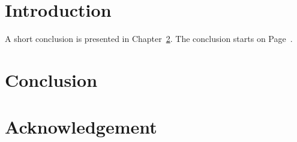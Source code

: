 \documentclass[12pt, a4paper]{book}
\begin{document}
	\frontmatter
		\maketitle
		\tableofcontents
	\mainmatter
		\chapter{Introduction}
		A short conclusion is presented in Chapter~\ref{TheEnd}.
		The conclusion starts on Page~\pageref{TheEnd}.
		\chapter{Conclusion}
		\label{TheEnd}
	\backmatter
		\chapter*{Acknowledgement}
		
\end{document}
